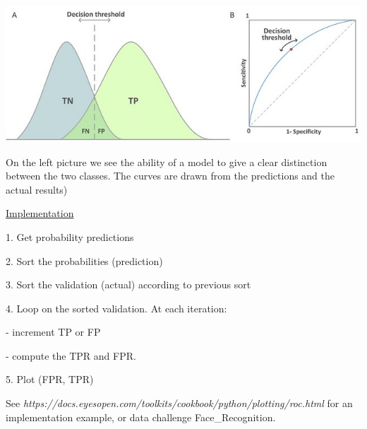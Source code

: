 \vspace{5mm}

\includegraphics[scale=0.5]{overlap_roc.jpeg}

\vspace{5mm}

On the left picture we see the ability of a model to give a clear distinction between the two classes. The curves are drawn from the predictions and the actual results)

\vspace{5mm}

\underline{Implementation}

\vspace{5mm}

1. Get probability predictions

2. Sort the probabilities (prediction)

3. Sort the validation (actual) according to previous sort

4. Loop on the sorted validation. At each iteration:

- increment TP or FP

- compute the TPR and FPR.

5. Plot (FPR, TPR)

\vspace{5mm}

See \textit{https://docs.eyesopen.com/toolkits/cookbook/python/plotting/roc.html} for an implementation example, or data challenge Face\_Recognition.

\vspace{5mm}
